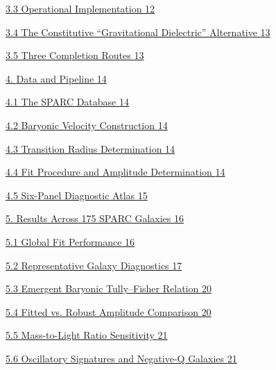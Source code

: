 \hyperref[operational-implementation]{3.3 Operational Implementation \hyperref[operational-implementation]{12}}

\hyperref[the-constitutive-gravitational-dielectric-alternative]{3.4 The Constitutive ``Gravitational Dielectric'' Alternative \hyperref[the-constitutive-gravitational-dielectric-alternative]{13}}

\hyperref[three-completion-routes]{3.5 Three Completion Routes \hyperref[three-completion-routes]{13}}

\hyperref[data-and-pipeline]{4. Data and Pipeline \hyperref[data-and-pipeline]{14}}

\hyperref[the-sparc-database]{4.1 The SPARC Database \hyperref[the-sparc-database]{14}}

\hyperref[baryonic-velocity-construction]{4.2 Baryonic Velocity Construction \hyperref[baryonic-velocity-construction]{14}}

\hyperref[transition-radius-determination]{4.3 Transition Radius Determination \hyperref[transition-radius-determination]{14}}

\hyperref[fit-procedure-and-amplitude-determination]{4.4 Fit Procedure and Amplitude Determination \hyperref[fit-procedure-and-amplitude-determination]{14}}

\hyperref[six-panel-diagnostic-atlas]{4.5 Six-Panel Diagnostic Atlas \hyperref[six-panel-diagnostic-atlas]{15}}

\hyperref[results-across-175-sparc-galaxies]{5. Results Across 175 SPARC Galaxies \hyperref[results-across-175-sparc-galaxies]{16}}

\hyperref[global-fit-performance]{5.1 Global Fit Performance \hyperref[global-fit-performance]{16}}

\hyperref[representative-galaxy-diagnostics]{5.2 Representative Galaxy Diagnostics \hyperref[representative-galaxy-diagnostics]{17}}

\hyperref[emergent-baryonic-tullyfisher-relation]{5.3 Emergent Baryonic Tully--Fisher Relation \hyperref[emergent-baryonic-tullyfisher-relation]{20}}

\hyperref[fitted-vs.-robust-amplitude-comparison]{5.4 Fitted vs. Robust Amplitude Comparison \hyperref[fitted-vs.-robust-amplitude-comparison]{20}}

\hyperref[mass-to-light-ratio-sensitivity]{5.5 Mass-to-Light Ratio Sensitivity \hyperref[mass-to-light-ratio-sensitivity]{21}}

\hyperref[oscillatory-signatures-and-negative-q-galaxies]{5.6 Oscillatory Signatures and Negative-Q Galaxies \hyperref[oscillatory-signatures-and-negative-q-galaxies]{21}}

